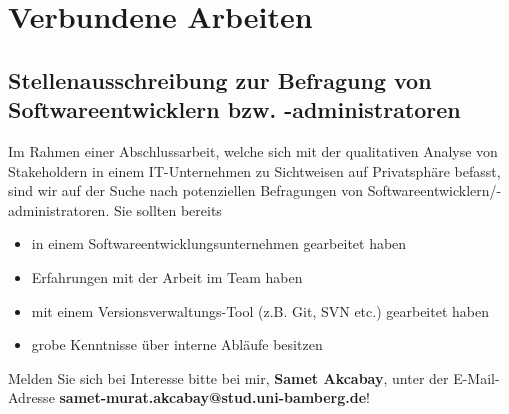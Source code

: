 \chapter{Verbundene Arbeiten}

\section{Stellenausschreibung zur Befragung von Softwareentwicklern bzw. -administratoren} \label{ausschreibung}
Im Rahmen einer Abschlussarbeit, welche sich mit der qualitativen Analyse von Stakeholdern in einem IT-Unternehmen zu Sichtweisen auf Privatsphäre befasst, sind wir auf der Suche nach potenziellen Befragungen von Softwareentwicklern/-administratoren. Sie sollten bereits
\begin{itemize}
    \item in einem Softwareentwicklungsunternehmen gearbeitet haben
    \item Erfahrungen mit der Arbeit im Team haben
    \item mit einem Versionsverwaltungs-Tool (z.B. Git, SVN etc.) gearbeitet haben
    \item grobe Kenntnisse über interne Abläufe besitzen
\end{itemize}
Melden Sie sich bei Interesse bitte bei mir, \textbf{Samet Akcabay}, unter der E-Mail-Adresse \textbf{samet-murat.akcabay@stud.uni-bamberg.de}!

